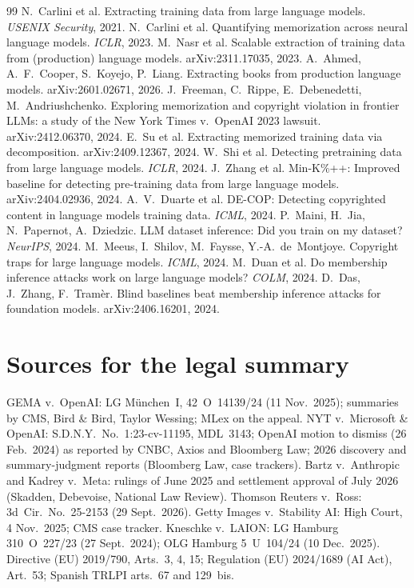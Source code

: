 \documentclass[10pt,a4paper]{article}
\begin{document}
\begin{thebibliography}{99}\small
{} N.~Carlini et al. Extracting training data from large language models. \emph{USENIX Security}, 2021.
 N.~Carlini et al. Quantifying memorization across neural language models. \emph{ICLR}, 2023.
 M.~Nasr et al. Scalable extraction of training data from (production) language models. arXiv:2311.17035, 2023.
 A.~Ahmed, A.~F.~Cooper, S.~Koyejo, P.~Liang. Extracting books from production language models. arXiv:2601.02671, 2026.
 J.~Freeman, C.~Rippe, E.~Debenedetti, M.~Andriushchenko. Exploring memorization and copyright violation in frontier LLMs: a study of the New York Times v.\ OpenAI 2023 lawsuit. arXiv:2412.06370, 2024.
 E.~Su et al. Extracting memorized training data via decomposition. arXiv:2409.12367, 2024.
 W.~Shi et al. Detecting pretraining data from large language models. \emph{ICLR}, 2024.
 J.~Zhang et al. Min-K\%++: Improved baseline for detecting pre-training data from large language models. arXiv:2404.02936, 2024.
 A.~V.~Duarte et al. DE-COP: Detecting copyrighted content in language models training data. \emph{ICML}, 2024.
 P.~Maini, H.~Jia, N.~Papernot, A.~Dziedzic. LLM dataset inference: Did you train on my dataset? \emph{NeurIPS}, 2024.
 M.~Meeus, I.~Shilov, M.~Faysse, Y.-A.~de~Montjoye. Copyright traps for large language models. \emph{ICML}, 2024.
 M.~Duan et al. Do membership inference attacks work on large language models? \emph{COLM}, 2024.
 D.~Das, J.~Zhang, F.~Tram\`er. Blind baselines beat membership inference attacks for foundation models. arXiv:2406.16201, 2024.
\end{thebibliography}

\appendix
\section*{Sources for the legal summary}
\small
GEMA v.\ OpenAI: LG M\"unchen~I, 42~O~14139/24 (11 Nov.\ 2025); summaries by CMS, Bird \& Bird, Taylor Wessing; MLex on
the appeal. NYT v.\ Microsoft \& OpenAI: S.D.N.Y.\ No.~1:23-cv-11195, MDL~3143; OpenAI motion to dismiss (26 Feb.\
2024) as reported by CNBC, Axios and Bloomberg Law; 2026 discovery and summary-judgment reports (Bloomberg Law, case
trackers). Bartz v.\ Anthropic and Kadrey v.\ Meta: rulings of June 2025 and settlement approval of July 2026
(Skadden, Debevoise, National Law Review). Thomson Reuters v.\ Ross: 3d~Cir.\ No.~25-2153 (29 Sept.\ 2026). Getty
Images v.\ Stability AI: High Court, 4 Nov.\ 2025; CMS case tracker. Kneschke v.\ LAION: LG Hamburg 310~O~227/23 (27
Sept.\ 2024); OLG Hamburg 5~U~104/24 (10 Dec.\ 2025). Directive (EU) 2019/790, Arts.~3, 4, 15; Regulation (EU)
2024/1689 (AI Act), Art.~53; Spanish TRLPI arts.~67 and 129~bis.
\end{document}

